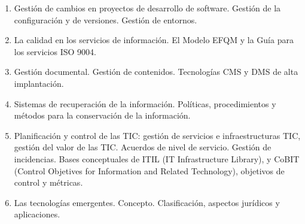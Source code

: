 \begin{enumerate}
		\item Gestión de cambios en proyectos de desarrollo de software. Gestión de la configuración y de versiones. Gestión de entornos.
		\item La calidad en los servicios de información. El Modelo EFQM y la Guía para los servicios ISO 9004.
		\item Gestión documental. Gestión de contenidos. Tecnologías CMS y DMS de alta implantación.
		\item Sistemas de recuperación de la información. Políticas, procedimientos y métodos para la conservación de la información.
		\item Planificación y control de las TIC: gestión de servicios e infraestructuras TIC, gestión del valor de las TIC. Acuerdos de nivel de servicio. Gestión de incidencias. Bases conceptuales de ITIL (IT Infrastructure Library), y CoBIT (Control Objetives for Information and Related Technology), objetivos de control y métricas.
		\item Las tecnologías emergentes. Concepto. Clasificación, aspectos jurídicos y aplicaciones.
	\end{enumerate}
